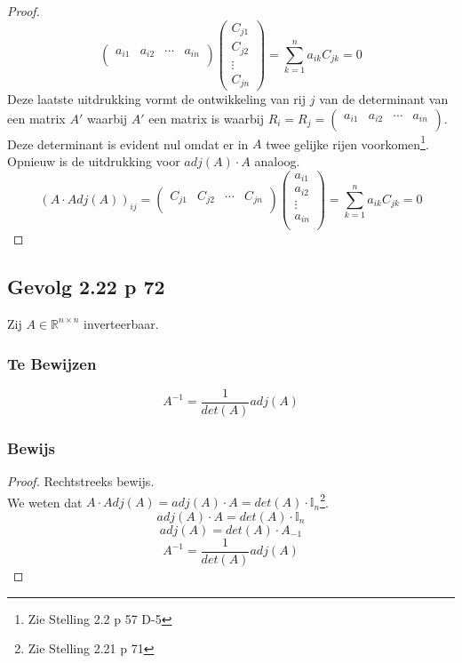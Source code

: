 \documentclass[lineaire_algebra_oplossingen.tex]{subfiles}
\begin{document}
\begin{proof}
\[\begin{pmatrix}
a_{i1} & a_{i2}&\cdots&a_{in}\\
\end{pmatrix}
\begin{pmatrix}
C_{j1}\\C_{j2}\\\vdots\\C_{jn}
\end{pmatrix}
=
\sum_{k=1}^na_{ik}C_{jk}
=0
\]
Deze laatste uitdrukking vormt de ontwikkeling van rij $j$ van de determinant van een matrix $A'$ waarbij $A'$ een matrix is waarbij $R_i = R_j = \begin{pmatrix}a_{i1} & a_{i2}&\cdots&a_{in}\\\end{pmatrix}$. Deze determinant is evident nul omdat er in $A$ twee gelijke rijen voorkomen\footnote{Zie Stelling 2.2 p 57 D-5}.\\
Opnieuw is de uitdrukking voor $adj(A) \cdot A$ analoog.
\[
(A\cdot Adj(A))_{ij} =
\begin{pmatrix}
C_{j1}&C_{j2}&\cdots&C_{jn}\\
\end{pmatrix}
\begin{pmatrix}
a_{i1}\\a_{i2}\\\vdots\\a_{in}\\
\end{pmatrix}
=
\sum_{k=1}^na_{ik}C_{jk}
=0
\]
\end{proof}

\subsection{Gevolg 2.22 p 72}
Zij $A \in \mathbb{R}^{n\times n}$ inverteerbaar.
\subsubsection*{Te Bewijzen}
\[
A^{-1} = \frac{1}{det(A)}adj(A)
\]
\subsubsection*{Bewijs}
\begin{proof}
Rechtstreeks bewijs.\\
We weten dat $A\cdot Adj(A) = adj(A) \cdot A = det(A)\cdot\mathbb{I}_n$\footnote{Zie Stelling 2.21 p 71}.
\[
adj(A) \cdot A = det(A)\cdot\mathbb{I}_n
\]
\[
adj(A) = det(A) \cdot A_{-1}
\]
\[
A^{-1} = \frac{1}{det(A)}adj(A)
\]
\end{proof}
\end{document}
